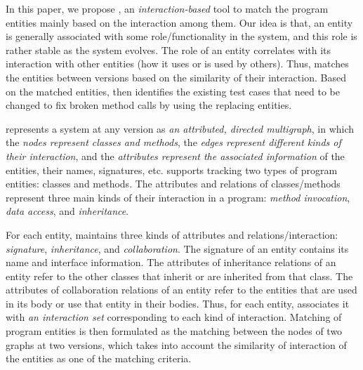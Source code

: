 
In this paper, we propose {\tool}, an {\em interaction-based} tool to
match the program entities mainly based on the interaction
among them. Our idea is that, an entity is generally associated
with some role/functionality in the system, and this role is rather
stable as the system evolves. The role of an entity correlates with
its interaction
with other entities (\eg how it uses or is used by others). Thus,
{\tool} matches the entities between versions based on the similarity
of their interaction.
Based on the matched entities, {\tool} then identifies the
existing test cases that need to be changed to fix broken method calls
by using the replacing entities.



{\tool} represents a system at any version as {\em an attributed,
  directed multigraph}, in which the {\em nodes represent classes and
  methods}, the {\em edges represent different kinds of their
  interaction}, and the {\em attributes represent the associated
  information} of the entities, \eg their names, signatures,
etc. {\tool} supports tracking two types of program entities: classes
and methods. The attributes and relations of classes/methods represent
three main kinds of their interaction in a program: {\em method
  invocation}, {\em data access}, and {\em inheritance}.

For each entity, {\tool} maintains three kinds of attributes and
relations/interaction: {\em signature}, {\em inheritance}, and {\em
  collaboration}. The signature of an entity contains its name and
interface information. The attributes of inheritance relations of an
entity refer to the other classes that inherit or are inherited from
that class. The attributes of collaboration relations of an entity
refer to the entities that are used in its body or use that entity in
their bodies.  Thus, for each entity, {\tool} associates it with {\em
  an interaction set} corresponding to each kind of
interaction. Matching of program entities is then formulated as the
matching between the nodes of two graphs at two versions, which takes
into account the similarity of interaction of the entities as one of
the matching criteria.


